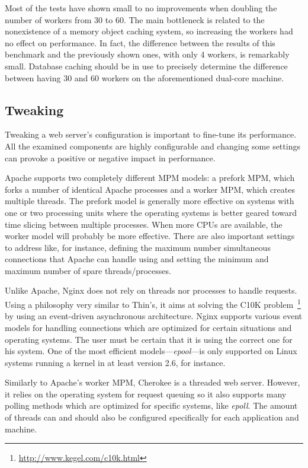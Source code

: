 Most of the tests have shown small to no improvements when doubling the number of workers from 30 to 60. The main bottleneck is related to the nonexistence of a memory object caching system, so increasing the workers had no effect on performance. In fact, the difference between the results of this benchmark and the previously shown ones, with only 4 workers, is remarkably small. Database caching should be in use to precisely determine the difference between having 30 and 60 workers on the aforementioned dual-core machine.

\subsection{Tweaking}
Tweaking a web server's configuration is important to fine-tune its performance. All the examined components are highly configurable and changing some settings can provoke a positive or negative impact in performance.

Apache supports two completely different MPM models: a prefork MPM, which forks a number of identical Apache processes and a worker MPM, which creates multiple threads. The prefork model is generally more effective on systems with one or two processing units where the operating systems is better geared toward time slicing between multiple processes. When more CPUs are available, the worker model will probably be more effective. There are also important settings to address like, for instance, defining the maximum number simultaneous connections that Apache can handle using  and setting the minimum and maximum number of spare threads/processes.

Unlike Apache, Nginx does not rely on threads nor processes to handle requests. Using a philosophy very similar to Thin's, it aims at solving the C10K problem~\footnote{\url{http://www.kegel.com/c10k.html}} by using an event-driven asynchronous architecture. Nginx supports various event models for handling connections which are optimized for certain situations and operating systems. The user must be certain that it is using the correct one for his system. One of the most efficient models---\textit{epool}---is only supported on Linux systems running a kernel in at least version 2.6, for instance.

Similarly to Apache's worker MPM, Cherokee is a threaded web server. However, it relies on the operating system for request queuing so it also supports many polling methods which are optimized for specific systems, like \textit{epoll}. The amount of threads can and should also be configured specifically for each application and machine.

